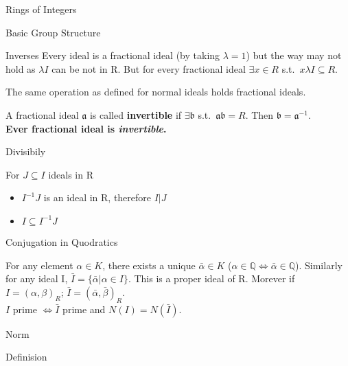 \documentclass[12pt, letterpaper]{article}
\newcommand{\Q}{\mathbb{Q}}
\newcommand{\id}[1]{\mathfrak{#1}}
\begin{document}
\begin{section}{Rings of Integers}
\begin{subsection}{Basic Group Structure}
\begin{subsubsection}{Inverses}
      Every ideal is a fractional ideal (by taking \(\lambda = 1\)) but the
      way may not hold as \(\lambda I\) can be not in R. But for every
      fractional ideal \(\exists x \in R\) s.t.\ \(x \lambda I \subseteq R\).

      The same operation as defined for normal ideals holds fractional ideals.

      A fractional ideal \(\id{a}\) is called \textbf{invertible} if \(\exists
      \id{b}\) s.t.\ \(\id{a} \id{b} = R\). Then \(\id{b} = \id{a}^{-1}\). \\
      \textbf{Ever fractional ideal is \emph{invertible}.}

    \end{subsubsection}

    \begin{subsubsection}{Divisibily}

      For \(J \subseteq I\) ideals in R
      \begin{itemize}
        \item \(I^{-1} J\) is an ideal in R, therefore \(I | J\)
        \item \(I \subseteq I^{-1} J\)
      \end{itemize}

    \end{subsubsection}

    \begin{subsubsection}{Conjugation in Quodratics}

      For any element \(\alpha \in K\), there exists a unique \(\bar{\alpha}
      \in K\) (\(\alpha \in \Q \iff \bar{\alpha} \in \Q\)). Similarly for any
      ideal I, \(\bar{I} = \{ \bar{\alpha} | \alpha \in I \}\). This is a proper
      ideal of R. Morever if \(I = (\alpha, \beta)_{R}\); \(\bar{I} =
      (\bar{\alpha}, \bar{\beta})_{R}\). \\
      \(I\) prime \(\iff \bar{I}\) prime and \(N(I) = N(\bar{I})\).

    \end{subsubsection}

  \end{subsection}

  \begin{subsection}{Norm}

    \begin{subsubsection}{Definision}


\end{subsubsection}
\end{subsection}
\end{section}
\end{document}
